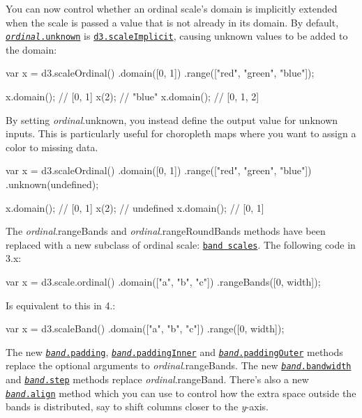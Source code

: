 You can now control whether an ordinal scale’s domain is implicitly extended when the scale is passed a value that is not already in its domain. By default, \href{https://github.com/d3/d3-scale/blob/master/README.md#ordinal_unknown}{\tt {\itshape ordinal}.unknown} is \href{https://github.com/d3/d3-scale/blob/master/README.md#scaleImplicit}{\tt d3.\+scale\+Implicit}, causing unknown values to be added to the domain\+:


\begin{DoxyCode}
var x = d3.scaleOrdinal()
    .domain([0, 1])
    .range(["red", "green", "blue"]);

x.domain(); // [0, 1]
x(2); // "blue"
x.domain(); // [0, 1, 2]
\end{DoxyCode}


By setting {\itshape ordinal}.unknown, you instead define the output value for unknown inputs. This is particularly useful for choropleth maps where you want to assign a color to missing data.


\begin{DoxyCode}
var x = d3.scaleOrdinal()
    .domain([0, 1])
    .range(["red", "green", "blue"])
    .unknown(undefined);

x.domain(); // [0, 1]
x(2); // undefined
x.domain(); // [0, 1]
\end{DoxyCode}


The {\itshape ordinal}.range\+Bands and {\itshape ordinal}.range\+Round\+Bands methods have been replaced with a new subclass of ordinal scale\+: \href{https://github.com/d3/d3-scale/blob/master/README.md#band-scales}{\tt band scales}. The following code in 3.\+x\+:


\begin{DoxyCode}
var x = d3.scale.ordinal()
    .domain(["a", "b", "c"])
    .rangeBands([0, width]);
\end{DoxyCode}


Is equivalent to this in 4.\+:


\begin{DoxyCode}
var x = d3.scaleBand()
    .domain(["a", "b", "c"])
    .range([0, width]);
\end{DoxyCode}


The new \href{https://github.com/d3/d3-scale/blob/master/README.md#band_padding}{\tt {\itshape band}.padding}, \href{https://github.com/d3/d3-scale/blob/master/README.md#band_paddingInner}{\tt {\itshape band}.padding\+Inner} and \href{https://github.com/d3/d3-scale/blob/master/README.md#band_paddingOuter}{\tt {\itshape band}.padding\+Outer} methods replace the optional arguments to {\itshape ordinal}.range\+Bands. The new \href{https://github.com/d3/d3-scale/blob/master/README.md#band_bandwidth}{\tt {\itshape band}.bandwidth} and \href{https://github.com/d3/d3-scale/blob/master/README.md#band_step}{\tt {\itshape band}.step} methods replace {\itshape ordinal}.range\+Band. There’s also a new \href{https://github.com/d3/d3-scale/blob/master/README.md#band_align}{\tt {\itshape band}.align} method which you can use to control how the extra space outside the bands is distributed, say to shift columns closer to the {\itshape y}-\/axis.


